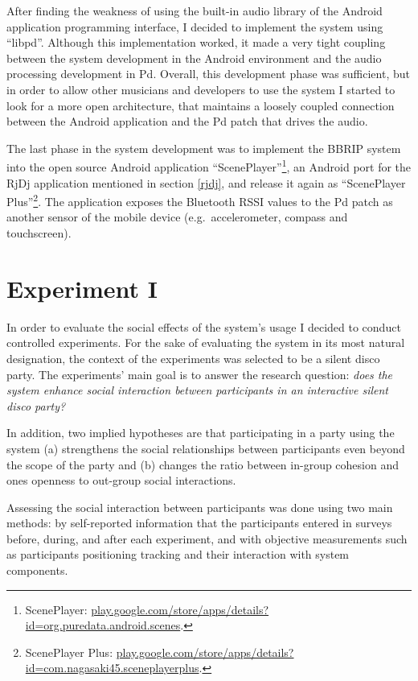 \documentclass[a4paper,11pt]{article}
\begin{document}
{After finding the weakness of using the built-in audio library of the Android application programming interface, I decided to implement the system using ``libpd''.
Although this implementation worked, it made a very tight coupling between the system development in the Android environment and the audio processing development in Pd.
Overall, this development phase was sufficient, but in order to allow other musicians and developers to use the system I started to look for a more open architecture, that maintains a loosely coupled connection between the Android application and the Pd patch that drives the audio.

The last phase in the system development was to implement the BBRIP system into the open source Android application ``ScenePlayer''\footnote{ScenePlayer: \href{http://play.google.com/store/apps/details?id=org.puredata.android.scenes}{play.google.com/store/apps/details?id=org.puredata.android.scenes}.}, an Android port for the RjDj application mentioned in section \ref{rjdj}, and release it again as ``ScenePlayer Plus''\footnote{ScenePlayer Plus: \href{http://play.google.com/store/apps/details?id=com.nagasaki45.sceneplayerplus}{play.google.com/store/apps/details?id=com.nagasaki45.sceneplayerplus}.}.
The application exposes the Bluetooth RSSI values to the Pd patch as another sensor of the mobile device (e.g.\ accelerometer, compass and touchscreen).

\section{Experiment I}

In order to evaluate the social effects of the system's usage I decided to conduct controlled experiments.
For the sake of evaluating the system in its most natural designation, the context of the experiments was selected to be a silent disco party.
The experiments' main goal is to answer the research question: \emph{does the system enhance social interaction between participants in an interactive silent disco party?}

In addition, two implied hypotheses are that participating in a party using the system (a) strengthens the social relationships between participants even beyond the scope of the party and (b) changes the ratio between in-group cohesion and ones openness to out-group social interactions.

Assessing the social interaction between participants was done using two main methods: by self-reported information that the participants entered in surveys before, during, and after each experiment, and with objective measurements such as participants positioning tracking and their interaction with system components.

}
\end{document}
